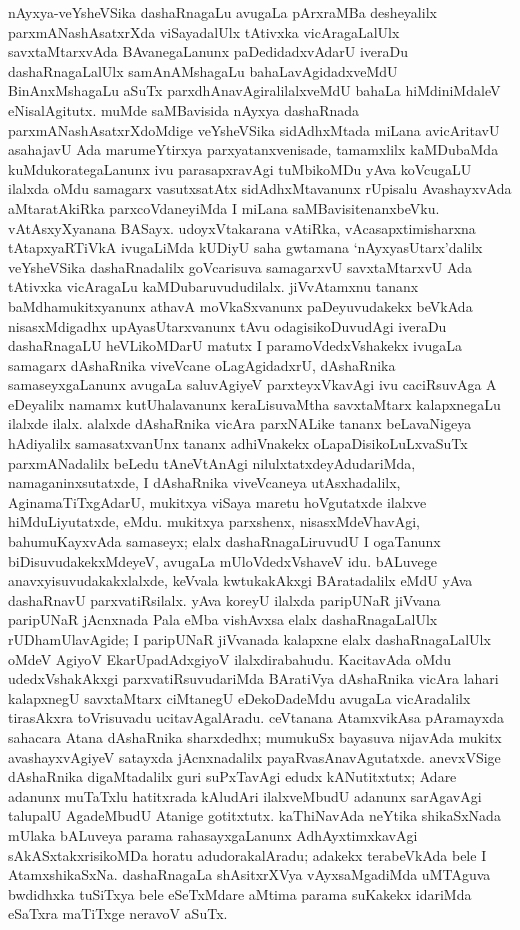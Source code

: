 nAyxya-veYsheVSika dashaRnagaLu avugaLa pArxraMBa desheyalilx parxmANashAsatxrXda viSaya\-dalUlx tAtivxka vicAragaLalUlx savxtaMtarxvAda BAvanegaLanunx paDedidadxvAdarU ive\-raDu dashaRnagaLalUlx samAnAMshagaLu bahaLavAgidadxveMdU BinAnxMshagaLu aSuTx parxdhAna\-vAgi\-ralilalxveMdU bahaLa hiMdiniMdaleV eNisalAgitutx. muMde saMBavi\-sida nAyxya dashaRnada parxmANashAsatxrXdoMdige veYsheVSika sidAdhxMtada miLana avicA\-ritavU asahajavU Ada marumeYtirxya parxyatanxvenisade, tamamxlilx kaMDubaMda kuMdukorategaLanunx ivu para\-sapxravAgi tuMbikoMDu yAva koVcugaLU ilalxda oMdu samagarx vasutxsatAtx sidAdhxMta\-vanunx rUpisalu AvashayxvAda aMtaratAkiRka parxcoVdaneyiMda I miLana saMBavisi\-tenanxbeVku. vAtAsxyXyanana BASayx. udoyxVtakarana vAtiRka, vAcasapxtimisharxna tAtapxyaR\-TiVkA ivugaLiMda kUDiyU saha gwtamana `nAyxyasUtarx'dalilx veYsheVSika dashaRnadalilx goVcarisuva samagarxvU savxtaMtarxvU Ada tAtivxka vicAragaLu kaMDubaruvududilalx. jiVvAtamxnu tananx baMdhamukitxyanunx athavA moVkaSxvanunx paDeyuvudakekx beVkAda nisasxMdigadhx upAyasUtarxvanunx tAvu odagisikoDuvudAgi iveraDu dashaRnagaLU heVLikoMDarU matutx I paramoV\-dedxVshakekx ivugaLa samagarx dAshaRnika viveVcane oLagAgidadxrU, dAshaRnika samaseyxgaLanunx avu\-gaLa saluvAgiyeV parxteyxVkavAgi ivu caciRsuvAga A eDeyalilx namamx kutUhala\-vanunx keraLi\-suvaMtha savxtaMtarx kalapxnegaLu ilalxde ilalx. alalxde dAshaRnika vicAra parxNA\-Like tananx beLavaNigeya hAdiyalilx samasatxvanUnx tananx adhiVnakekx oLapaDisikoLuLxvaSuTx parxmANa\-dalilx beLedu tAneVtAnAgi nilulxtatxdeyAdudariMda, namaganinxsutatxde, I dAshaRnika viveVcaneya utAsxhadalilx, AginamaTiTxgAdarU, mukitxya viSaya maretu hoVgutatxde ilalxve hiMduLiyutatxde, eMdu. mukitxya parxshenx, nisasxMdeVhavAgi, bahumuKayxvAda samaseyx; elalx dashaRnagaLiruvudU I ogaTanunx biDisuvudakekxMdeyeV, avugaLa mUloV\-dedxVshaveV idu. bALuvege anavxyisuvudakakxlalxde, keVvala kwtukakAkxgi BAratadalilx eMdU yAva dashaRnavU parxvatiRsilalx. yAva koreyU ilalxda paripUNaR jiVvana paripUNaR jAcnxnada Pala eMba vishAvxsa elalx dashaRnagaLalUlx rUDhamUlavAgide; I paripUNaR jiVvanada kalapxne elalx dashaRnagaLalUlx oMdeV AgiyoV EkarUpadAdxgiyoV ilalxdira\-bahudu. KacitavAda oMdu udedxVshakAkxgi parxvatiRsuvudariMda BAratiVya dAshaRnika vicAra lahari kalapxnegU savxtaMtarx ciMtanegU eDekoDadeMdu avugaLa vicAradalilx tira\-sAkxra toVrisuvadu ucitavAgalAradu. ceVtanana AtamxvikAsa pAramayxda sahacara Atana dAshaRnika sharxdedhx; mumukuSx bayasuva nijavAda mukitx avashayxvAgiyeV satayxda jAcnxna\-dalilx payaRvasAnavAgutatxde. anevxVSige dAshaRnika digaMtadalilx guri suPxTavAgi edudx kANutitxtutx; Adare adanunx muTaTxlu hatitxrada kAludAri ilalxveMbudU adanunx sarAga\-vAgi talupalU AgadeMbudU Atanige gotitxtutx. kaThiNavAda neYtika shikaSxNada \hbox{mUlaka} bALuveya parama rahasayxgaLanunx AdhAyxtimxkavAgi sAkASxtakxrisikoMDa horatu adu\break doraka\-lAradu; adakekx terabeVkAda bele I AtamxshikaSxNa. dashaRnagaLa shAsitxrXVya vAyxsaMga\-diMda uMTAguva bwdidhxka tuSiTxya bele eSeTxMdare aMtima parama suKakekx idariMda eSaTxra maTiTxge neravoV aSuTx.

